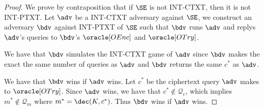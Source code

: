 \begin{proof}
We prove by contraposition that if $\SE$ is not INT-CTXT, then it is not INT-PTXT. Let $\adv$ be a INT-CTXT adversary against $\SE$, we construct an adversary $\bdv$ against INT-PTXT of $\SE$ such that $\bdv$ runs $\adv$ and replys $\adv$'s queries to $\bdv$'s $\oracle[OEnc]$ and $\oracle[OTry]$. 

We have that $\bdv$ simulates the INT-CTXT game of $\adv$ since $\bdv$ makes the exact the same number of queries as $\adv$ and $\bdv$ returns the same $c^*$ as $\adv$. 

We have that $\bdv$ wins if $\adv$ wins. Let $c^*$ be the ciphertext query $\adv$ makes to $\oracle[OTry]$. Since $\adv$ wins, we have that $c^* \not\in \mathcal{Q}_c$, which implies $m^* \not\in \mathcal{Q}_m$ where $m^* = \dec(K, c^*)$. Thus $\bdv$ wins if $\adv$ wins. 

\end{proof}